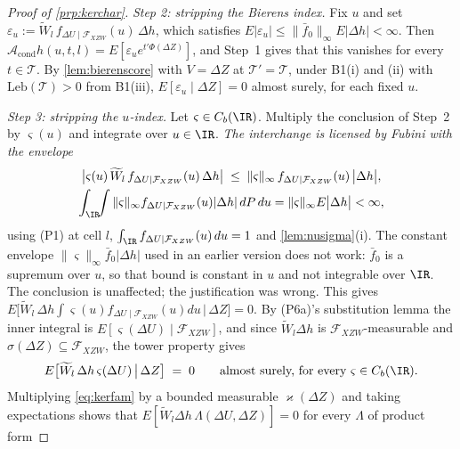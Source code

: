 \begin{proof}[Proof of \cref{prp:kerchar}]
\emph{Step 2: stripping the Bierens index.}
Fix $u$ and set $\varepsilon_u:=\widetilde W_l\,f_{\Delta U\mid\mathcal F_{XZW}}(u)\,\Delta h$, which
satisfies $E|\varepsilon_u|\le\|\bar f_0\|_\infty E|\Delta h|<\infty$. Then
$\mathcal A_{\mathrm{cond}}h(u,t,l)=E[\varepsilon_u e^{t'\Phi(\Delta Z)}]$, and Step~1 gives that this
vanishes for every $t\in\mathcal T$. By \cref{lem:bierenscore} with $V=\Delta Z$ at
$\mathcal T'=\mathcal T$, under B1(i) and (ii) with $\mathrm{Leb}(\mathcal T)>0$ from B1(iii),
$E[\varepsilon_u\mid\Delta Z]=0$ almost surely, for each fixed $u$.

\emph{Step 3: stripping the $u$-index.}
Let $\varsigma\in C_b(\IR)$. Multiply the conclusion of Step~2 by $\varsigma(u)$ and integrate over
$u\in\IR$. \emph{The interchange is licensed by Fubini with the envelope}
\begin{gather*}
\big|\varsigma(u)\,\widetilde W_l\,f_{\Delta U\mid\mathcal F_{XZW}}(u)\,\Delta h\big|
\;\le\;\|\varsigma\|_\infty\,f_{\Delta U\mid\mathcal F_{XZW}}(u)\,\big|\Delta h\big|, \\
\int_{\IR}\!\!\int\|\varsigma\|_\infty f_{\Delta U\mid\mathcal F_{XZW}}(u)|\Delta h|\,dP\,du
=\|\varsigma\|_\infty E\big|\Delta h\big|<\infty,
\end{gather*}
using (P1) at cell $l$, $\int_{\IR}f_{\Delta U\mid\mathcal F_{XZW}}(u)\,du=1$ and
\cref{lem:nusigma}(i). The
constant envelope $\|\varsigma\|_\infty\bar f_0|\Delta h|$ used in an earlier version does not work: $\bar f_0$
is a supremum over $u$, so that bound is constant in $u$ and not integrable over $\IR$. The conclusion is
unaffected; the justification was wrong. This gives
$E\big[\widetilde W_l\,\Delta h\int\varsigma(u)f_{\Delta U\mid\mathcal F_{XZW}}(u)du\,\big|\,\Delta Z\big]=0$.
By (P6a)'s substitution lemma the inner integral is $E[\varsigma(\Delta U)\mid\mathcal F_{XZW}]$, and
since $\widetilde W_l\Delta h$ is $\mathcal F_{XZW}$-measurable and $\sigma(\Delta Z)\subseteq\mathcal F_{XZW}$,
the tower property gives
\begin{equation}\label{eq:kerfam}
E\big[\widetilde W_l\,\Delta h\,\varsigma(\Delta U)\,\big|\,\Delta Z\big]\;=\;0
\qquad\text{almost surely, for every }\varsigma\in C_b(\IR).
\end{equation}
Multiplying \eqref{eq:kerfam} by a bounded measurable $\varkappa(\Delta Z)$ and taking expectations shows
that $E[\widetilde W_l\Delta h\,\Lambda(\Delta U,\Delta Z)]=0$ for every $\Lambda$ of product form

\end{proof}
